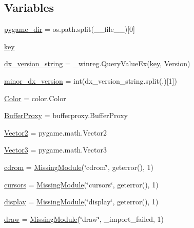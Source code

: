 \subsection*{Variables}
\begin{DoxyCompactItemize}
\item 
\hyperlink{namespacepygame_a590abc7e9fb09c1c5980fcb3b87eb341}{pygame\+\_\+dir} = os.\+path.\+split(\+\_\+\+\_\+file\+\_\+\+\_\+)\mbox{[}0\mbox{]}
\item 
\hyperlink{namespacepygame_a605356bb276b22993417ce95f178ab1d}{key}
\item 
\hyperlink{namespacepygame_adccef28882b2d4da0cf53454b5384604}{dx\+\_\+version\+\_\+string} = \+\_\+winreg.\+Query\+Value\+Ex(\hyperlink{namespacepygame_a605356bb276b22993417ce95f178ab1d}{key}, \textquotesingle{}Version\textquotesingle{})
\item 
\hyperlink{namespacepygame_a4c8442fd66c9fb9c56c452e296a21eb7}{minor\+\_\+dx\+\_\+version} = int(dx\+\_\+version\+\_\+string.\+split(\textquotesingle{}.\textquotesingle{})\mbox{[}1\mbox{]})
\item 
\hyperlink{namespacepygame_ad27cf54b626cb073b189d7171af414fb}{Color} = color.\+Color
\item 
\hyperlink{namespacepygame_ab17fba45a8059db2321d998dd3fea20d}{Buffer\+Proxy} = bufferproxy.\+Buffer\+Proxy
\item 
\hyperlink{namespacepygame_a0dc9802647a8da36ba7b3c067c4695e8}{Vector2} = pygame.\+math.\+Vector2
\item 
\hyperlink{namespacepygame_a0ddff43d641e42c5651cef77a9c57479}{Vector3} = pygame.\+math.\+Vector3
\item 
\hyperlink{namespacepygame_a4a815578de604c0b92d024a9d2a9bf90}{cdrom} = \hyperlink{classpygame_1_1_missing_module}{Missing\+Module}(\char`\"{}cdrom\char`\"{}, geterror(), 1)
\item 
\hyperlink{namespacepygame_a6d9d257e6de5d3cdfe8cf6d89b1b1471}{cursors} = \hyperlink{classpygame_1_1_missing_module}{Missing\+Module}(\char`\"{}cursors\char`\"{}, geterror(), 1)
\item 
\hyperlink{namespacepygame_aa1cf8c6beba55ddbc783465d6572b666}{display} = \hyperlink{classpygame_1_1_missing_module}{Missing\+Module}(\char`\"{}display\char`\"{}, geterror(), 1)
\item 
\hyperlink{namespacepygame_a8802baedc6d0a922faa3d799ece5bae5}{draw} = \hyperlink{classpygame_1_1_missing_module}{Missing\+Module}(\char`\"{}draw\char`\"{}, \+\_\+import\+\_\+failed, 1)
\item 

\end{DoxyCompactItemize}
